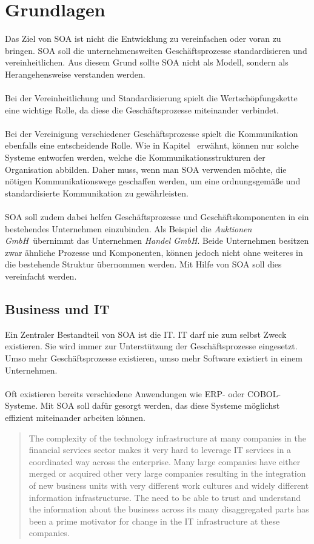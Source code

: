 \section{Grundlagen}
\label{sec:Grundlagen}
Das Ziel von SOA ist nicht die Entwicklung zu vereinfachen oder voran zu bringen. SOA soll die unternehmensweiten Geschäftsprozesse standardisieren und vereinheitlichen. Aus diesem Grund sollte SOA nicht als Modell, sondern als Herangehensweise verstanden werden.
\\\\
Bei der Vereinheitlichung und Standardisierung spielt die Wertschöpfungskette eine wichtige Rolle, da diese die Geschäftsprozesse miteinander verbindet.
\\\\
Bei der Vereinigung verschiedener Geschäftsprozesse spielt die Kommunikation ebenfalls eine entscheidende Rolle. Wie in Kapitel \ erwähnt, können nur solche Systeme entworfen werden, welche die Kommunikationsstrukturen der Organisation abbilden. Daher muss, wenn man SOA verwenden möchte, die nötigen Kommunikationswege geschaffen werden, um eine ordnungsgemäße und standardisierte Kommunikation zu gewährleisten.
\\\\
SOA soll zudem dabei helfen Geschäftsprozesse und Geschäftskomponenten in ein bestehendes Unternehmen einzubinden. Als Beispiel die \textit{Auktionen GmbH}\ übernimmt das Unternehmen \textit{Handel GmbH}. Beide Unternehmen besitzen zwar ähnliche Prozesse und Komponenten, können jedoch nicht ohne weiteres in die bestehende Struktur übernommen werden. Mit Hilfe von SOA soll dies vereinfacht werden.

\subsection{Business und IT}
\label{subsec:BusinessAndIT}
Ein Zentraler Bestandteil von SOA ist die IT. IT darf nie zum selbst Zweck existieren. Sie wird immer zur Unterstützung der Geschäftsprozesse eingesetzt. Umso mehr Geschäftsprozesse existieren, umso mehr Software existiert in einem Unternehmen.
\\\\
Oft existieren bereits verschiedene Anwendungen wie ERP- oder COBOL-Systeme. Mit SOA soll dafür gesorgt werden, das diese Systeme möglichst effizient miteinander arbeiten können.
\begin{quotation}
    \frqq The complexity of the technology infrastructure at many companies in the financial services sector makes it very hard to leverage IT services in a coordinated way across the enterprise. Many large companies have either merged or acquired other very large companies resulting in the integration of new business units with very different work cultures and widely different information infrastructurse. The need to be able to trust and understand the information about the business across its many disaggregated parts has been a prime motivator for change in the IT infrastructure at these companies.\flqq \cite[S. 17]{SOAForDummies}
\end{quotation}

